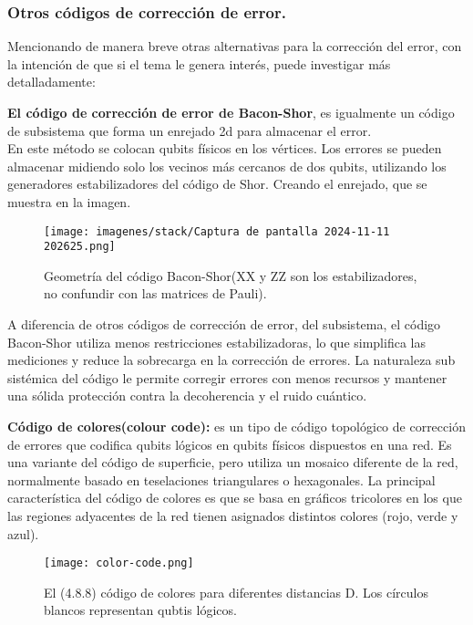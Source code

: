 \subsubsection{Otros códigos de corrección de error.}

Mencionando de manera breve otras alternativas para la corrección del error, con la intención de que si el tema le genera interés, puede investigar más detalladamente:

\textbf{El código de corrección de error de Bacon-Shor}, es igualmente un código de subsistema que forma un enrejado 2d para almacenar el error.\\

En este método se colocan qubits físicos en los vértices. Los errores se pueden almacenar midiendo solo los vecinos más cercanos de dos qubits, utilizando los generadores estabilizadores del código de Shor. Creando el enrejado, que se muestra en la imagen.\\

\begin{figure}[hbtp]
    \centering
    \texttt{[image: imagenes/stack/Captura de pantalla 2024-11-11 202625.png]}
    \caption{Geometría del código Bacon-Shor(XX y ZZ son los estabilizadores, no confundir con las matrices de Pauli).}
    \label{fig:codigo-superficie}
\end{figure}

A diferencia de otros códigos de corrección de error, del subsistema, el código Bacon-Shor utiliza menos restricciones estabilizadoras, lo que simplifica las mediciones y reduce la sobrecarga en la corrección de errores. La naturaleza sub sistémica del código le permite corregir errores con menos recursos y mantener una sólida protección contra la decoherencia y el ruido cuántico.

\textbf{Código de colores(colour code):} es un tipo de código topológico de corrección de errores que codifica qubits lógicos en qubits físicos dispuestos en una red. Es una variante del código de superficie, pero utiliza un mosaico diferente de la red, normalmente basado en teselaciones triangulares o hexagonales. La principal característica del código de colores es que se basa en gráficos tricolores en los que las regiones adyacentes de la red tienen asignados distintos colores (rojo, verde y azul).\\

\begin{figure}
    \centering
    \texttt{[image: color-code.png]}
    \caption{El (4.8.8) código de colores para diferentes distancias D. Los círculos blancos representan qubtis lógicos.}
    \label{fig:enter-label}
\end{figure}

